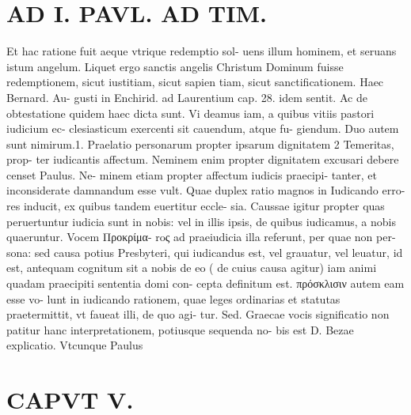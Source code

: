 \documentclass{article}
\begin{document}
\begin{pages}
\section*{AD I. PAVL. AD TIM. }
\marginpar{[ p.336 ]}\pstart Et hac ratione fuit aeque vtrique redemptio sol- uens illum hominem, et seruans istum angelum. Liquet ergo sanctis angelis Christum Dominum fuisse redemptionem, sicut iustitiam, sicut sapien tiam, sicut sanctificationem. Haec Bernard. Au- gusti in Enchirid. ad Laurentium cap. 28. idem sentit. Ac de obtestatione quidem haec dicta sunt. Vi deamus iam, a quibus vitiis pastori iudicium ec- clesiasticum exercenti sit cauendum, atque fu- giendum. Duo autem sunt nimirum.1. Praelatio personarum propter ipsarum dignitatem 2 Temeritas, prop- ter iudicantis affectum. Neminem enim propter dignitatem excusari debere censet Paulus. Ne- minem etiam propter affectum iudicis praecipi- tanter, et inconsiderate damnandum esse vult. Quae duplex ratio magnos in Iudicando erro- res inducit, ex quibus tandem euertitur eccle- sia. Caussae igitur propter quas peruertuntur iudicia sunt in nobis: vel in illis ipsis, de quibus iudicamus, a nobis quaeruntur. Vocem Προκρίμα- roς ad praeiudicia illa referunt, per quae non per- sona: sed causa potius Presbyteri, qui iudicandus est, vel grauatur, vel leuatur, id est, antequam cognitum sit a nobis de eo ( de cuius causa agitur) iam animi quadam praecipiti sententia domi con- cepta definitum est. πρόσκλισιν autem eam esse vo- lunt in iudicando rationem, quae leges ordinarias et statutas praetermittit, vt faueat illi, de quo agi- tur. Sed. Graecae vocis significatio non patitur hanc interpretationem, potiusque sequenda no- bis est D. Bezae explicatio. Vtcunque Paulus  \pend
\section*{CAPVT  V. }
\marginpar{[ p.337 ]}\pstart {}
{}

\end{pages}
\end{document}
